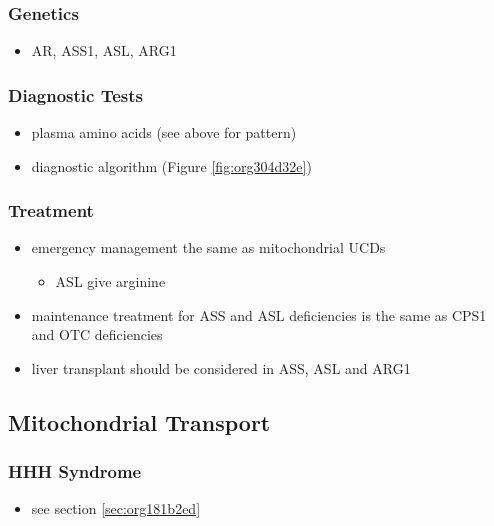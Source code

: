\documentclass{scrartcl}
\begin{document}
\subsubsection{Genetics}
\label{sec:org0509e08}
\begin{itemize}
\item AR, ASS1, ASL, ARG1
\end{itemize}

\subsubsection{Diagnostic Tests}
\label{sec:org27263f9}
\begin{itemize}
\item plasma amino acids (see above for pattern)
\item diagnostic algorithm (Figure \ref{fig:org304d32e})
\end{itemize}

\subsubsection{Treatment}
\label{sec:org4e08c61}
\begin{itemize}
\item emergency management the same as mitochondrial UCDs
\begin{itemize}
\item ASL give arginine
\end{itemize}
\item maintenance treatment for ASS and ASL deficiencies is the same as
CPS1 and OTC deficiencies
\item liver transplant should be considered in ASS, ASL and ARG1
\end{itemize}

\subsection{Mitochondrial Transport}
\label{sec:orgad48bb7}
\subsubsection{HHH Syndrome}
\label{sec:org89d43a3}
\begin{itemize}
\item see section \ref{sec:org181b2ed}
\end{itemize}
\end{document}
